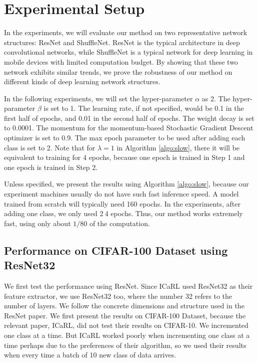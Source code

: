 \section{Experimental Setup}

In the experiments, we will evaluate our method on two representative network structures: ResNet and ShuffleNet. ResNet is the typical architecture in deep convolutional networks, while ShuffleNet is a typical network for deep learning in mobile devices with limited computation budget. By showing that these two network exhibits similar trends, we prove the robustness of our method on different kinds of deep learning network structures. 

In the following experiments, we will set the hyper-parameter $\alpha$ as 2. The hyper-parameter $\beta$ is set to 1. The learning rate, if not specified, would be 0.1 in the first half of epochs, and 0.01 in the second half of epochs. The weight decay is set to 0.0001. The momentum for the momentum-based Stochastic Gradient Descent optimizer is set to 0.9. The max epoch parameter to be used after adding each class is set to 2. Note that for $\lambda=1$ in Algorithm \ref{algo:slow}, there it will be equivalent to training for 4 epochs, because one epoch is trained in Step 1 and one epoch is trained in Step 2.

Unless specified, we present the results using Algorithm \ref{algo:slow}, because our experiment machines usually do not have such fast inference speed. A model trained from scratch will typically need 160 epochs. In the experiments, after adding one class, we only used $2~4$ epochs. Thus, our method works extremely fast, using only about $1/80$ of the computation.

\subsection{Performance on CIFAR-100 Dataset using ResNet32}

We first test the performance using ResNet. Since ICaRL used ResNet32 as their feature extractor, we use ResNet32 too, where the number 32 refers to the number of layers. We follow the concrete dimensions and structure used in the ResNet paper\cite{he2016deep}. We first present the results on CIFAR-100 Dataset, because the relevant paper, ICaRL, did not test their results on CIFAR-10. We incremented one class at a time. But ICaRL worked poorly when incrementing one class at a time perhaps due to the preferences of their algorithm, so we used their results when every time a batch of 10 new class of data arrives. 

